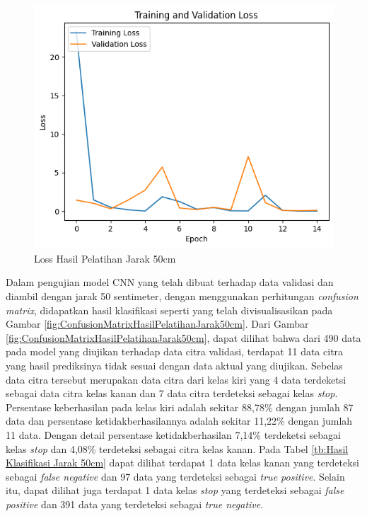 \begin{figure} [H] \centering
  \includegraphics[scale=0.7]{gambar/50loss.png}
  \caption{Loss Hasil Pelatihan Jarak 50cm}
  \label{fig:LossHasilPelatihanJarak50cm}
\end{figure}

Dalam pengujian model CNN yang telah dibuat terhadap data validasi dan diambil dengan jarak 50 sentimeter, dengan menggunakan perhitungan \emph{confusion matrix}, didapatkan hasil klasifikasi seperti yang telah divisualisasikan pada Gambar \ref{fig:ConfusionMatrixHasilPelatihanJarak50cm}. Dari Gambar \ref{fig:ConfusionMatrixHasilPelatihanJarak50cm}, dapat dilihat bahwa dari 490 data pada model yang diujikan terhadap data citra validasi, terdapat 11 data citra yang hasil prediksinya tidak sesuai dengan data aktual yang diujikan. Sebelas data citra tersebut merupakan data citra dari kelas kiri yang 4 data terdeketsi sebagai data citra kelas kanan dan 7 data citra terdeteksi sebagai kelas \emph{stop}. Persentase keberhasilan pada kelas kiri adalah sekitar 88,78\% dengan jumlah 87 data dan persentase ketidakberhasilannya adalah sekitar 11,22\% dengan jumlah 11 data. Dengan detail persentase ketidakberhasilan 7,14\% terdeketsi sebagai kelas \emph{stop} dan 4,08\% terdeteksi sebagai citra kelas kanan. Pada Tabel \ref{tb:Hasil Klasifikasi Jarak 50cm} dapat dilihat terdapat 1 data kelas kanan yang terdeteksi sebagai \emph{false negative} dan 97 data yang terdeteksi sebagai \emph{true positive}. Selain itu, dapat dilihat juga terdapat 1 data kelas \emph{stop} yang terdeteksi sebagai \emph{false positive} dan 391 data yang terdeteksi sebagai \emph{true negative}.

